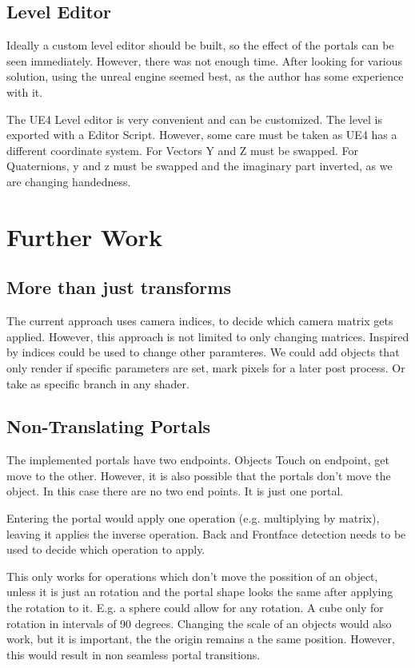 \subsection{Level Editor}
Ideally a custom level editor should be built, so the effect of the portals can be seen immediately. However, there was not enough time. After looking for various solution, using the unreal engine seemed best, as the author has some experience with it.

The UE4 Level editor is very convenient and can be customized. The level is exported with a Editor Script. However, some care must be taken as UE4 has a different coordinate system. For Vectors Y and Z must be swapped. For Quaternions, y and z must be swapped and the imaginary part inverted, as we are changing handedness.


\section{Further Work}
\subsection{More than just transforms}
\label{more than transforms}
The current approach uses camera indices, to decide which camera matrix gets applied. However, this approach is not limited to only changing matrices. Inspired by \cite{borst:2009:real} indices could be used to change other paramteres. We could add objects that only render if specific parameters are set, mark pixels for a later post process. Or take as specific branch in any shader.

\subsection{Non-Translating Portals}
The implemented portals have two endpoints. Objects Touch on endpoint, get move to the other. However, it is also possible that the portals don't move the object. In this case there are no two end points. It is just one portal.

Entering the portal would apply one operation (e.g. multiplying by matrix), leaving it applies the inverse operation. Back and Frontface detection needs to be used to decide which operation to apply.


This only works for operations which don't move the possition of an object, unless it is just an rotation and the portal shape looks the same after applying the rotation to it. E.g. a sphere could allow for any rotation. A cube only for rotation in intervals of 90 degrees.
Changing the scale of an objects would also work, but it is important, the the origin remains a the same position. However, this would result in non seamless portal transitions.

